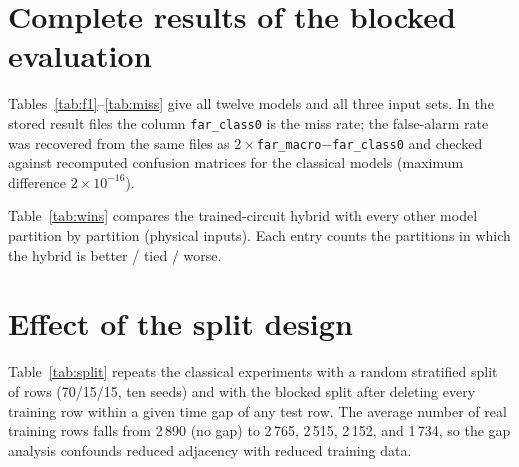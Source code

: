 \documentclass[10pt,a4paper]{article}
\newcommand{\T}[1]{}
\begin{document}
\begin{table}[h]\centering\small
\caption{The ten time blocks and their label counts.}\label{tab:blocks}
\T{S2_blocks}
\end{table}

\begin{table}[h]\centering\footnotesize
\caption{The ten partitions. Validation blocks are the two blocks not listed.}\label{tab:parts}
\resizebox{\linewidth}{!}{\T{S2_partitions}}
\end{table}

\section{Complete results of the blocked evaluation}
Tables~\ref{tab:f1}--\ref{tab:miss} give all twelve models and all three
input sets. In the stored result files the column \texttt{far\_class0} is
the miss rate; the false-alarm rate was recovered from the same files as
$2\times$\texttt{far\_macro}$-$\texttt{far\_class0} and checked against
recomputed confusion matrices for the classical models (maximum difference
$2\times10^{-16}$).

\begin{table}[h]\centering\small\caption{F1 score (macro average).}\label{tab:f1}\T{S1_f1}\end{table}
\begin{table}[h]\centering\small\caption{Area under the ROC curve.}\label{tab:auc}\T{S1_auc}\end{table}
\begin{table}[h]\centering\small\caption{False-alarm rate.}\label{tab:far}\T{S1_far}\end{table}
\begin{table}[h]\centering\small\caption{Miss rate.}\label{tab:miss}\T{S1_miss}\end{table}

Table~\ref{tab:wins} compares the trained-circuit hybrid with every other
model partition by partition (physical inputs). Each entry counts the
partitions in which the hybrid is better / tied / worse.

\begin{table}[h]\centering\small
\caption{Trained-circuit hybrid against each other model: partitions won / tied / lost (physical inputs).}\label{tab:wins}
\T{S5_wins}
\end{table}

\clearpage
\section{Effect of the split design}
Table~\ref{tab:split} repeats the classical experiments with a random
stratified split of rows (70/15/15, ten seeds) and with the blocked split
after deleting every training row within a given time gap of any test row.
The average number of real training rows falls from 2\,890 (no gap) to
2\,765, 2\,515, 2\,152, and 1\,734, so the gap analysis confounds reduced
adjacency with reduced training data.
\end{document}
